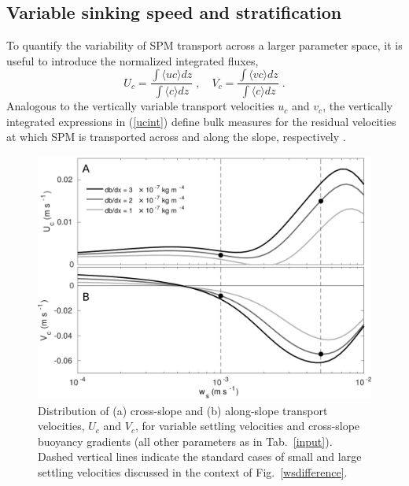 \subsection{Variable sinking speed and stratification}
To quantify the variability of SPM transport across a larger parameter
space, it is useful to introduce the normalized integrated fluxes,
\begin{equation}
  \label{ucint}
  U_c = \frac{ \int \langle uc \rangle dz}{\int \langle c \rangle dz}
  \; , \quad V_c = \frac{\int \langle vc \rangle dz}{\int \langle c
    \rangle dz} \; .
\end{equation}
Analogous to the vertically variable transport velocities $u_c$ and
$v_c$, the vertically integrated expressions in (\ref{ucint}) define
bulk measures for the residual velocities at which SPM is transported
across and along the slope, respectively \citep{schulzumlauf2016}.

\begin{figure}[ht]
  \noindent\includegraphics[width=30pc]{wsvariation.pdf}
  \caption{Distribution of (a) cross-slope and (b) along-slope
    transport velocities, $U_c$ and $V_c$, for variable settling
    velocities and cross-slope buoyancy gradients (all other
    parameters as in Tab.\ \ref{input}).  Dashed vertical lines
    indicate the standard cases of small and large settling velocities
    discussed in the context of
    Fig.\ \ref{wsdifference}.}\label{wsvariation}
\end{figure}


